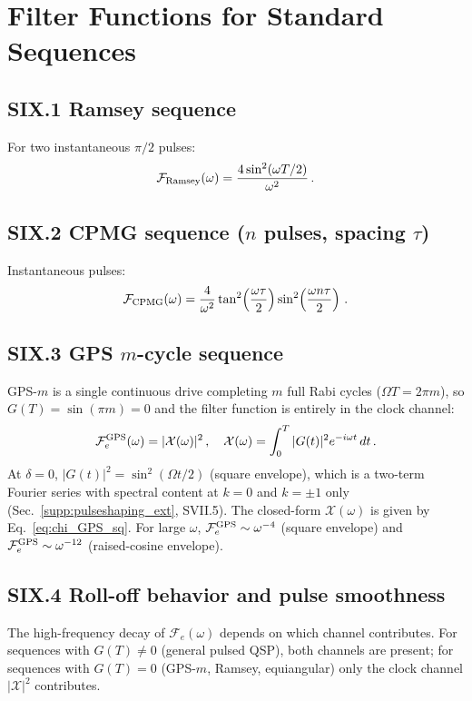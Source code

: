 \documentclass[aps,pra,twocolumn,superscriptaddress,longbibliography]{revtex4-2}
\newcommand{\be}{\begin{equation}}
\newcommand{\ee}{\end{equation}}
\begin{document}
\section{Filter Functions for Standard Sequences}
\label{supp:filter_functions}

\subsection*{SIX.1 Ramsey sequence}

For two instantaneous $\pi/2$ pulses:
\be
  \mathcal{F}_{\rm Ramsey}(\omega) = \frac{4\sin^2(\omega T/2)}{\omega^2}\,.
\ee

\subsection*{SIX.2 CPMG sequence ($n$ pulses, spacing $\tau$)}

Instantaneous pulses:
\be
  \mathcal{F}_{\rm CPMG}(\omega) = \frac{4}{\omega^2}
    \tan^2\!\left(\frac{\omega\tau}{2}\right)\sin^2\!\left(\frac{\omega n\tau}{2}\right)\,.
\ee

\subsection*{SIX.3 GPS $m$-cycle sequence}

GPS-$m$ is a single continuous drive completing $m$ full Rabi cycles ($\Omega T = 2\pi m$),
so $G(T)=\sin(\pi m)=0$ and the filter function is entirely in the clock channel:
\be
  \mathcal{F}_e^{\rm GPS}(\omega) = |\mathcal{X}(\omega)|^2\,,\quad
  \mathcal{X}(\omega) = \int_0^T|G(t)|^2 e^{-i\omega t}\,dt\,.
\ee
At $\delta=0$, $|G(t)|^2=\sin^2(\Omega t/2)$ (square envelope), which is a two-term
Fourier series with spectral content at $k=0$ and $k=\pm 1$ only
(Sec.~\ref{supp:pulseshaping_ext}, SVII.5).
The closed-form $\mathcal{X}(\omega)$ is given by Eq.~\eqref{eq:chi_GPS_sq}.
For large $\omega$, $\mathcal{F}_e^{\rm GPS}\sim\omega^{-4}$ (square envelope)
and $\mathcal{F}_e^{\rm GPS}\sim\omega^{-12}$ (raised-cosine envelope).

\subsection*{SIX.4 Roll-off behavior and pulse smoothness}

The high-frequency decay of $\mathcal{F}_e(\omega)$ depends on which channel
contributes.  For sequences with $G(T)\neq 0$ (general pulsed QSP), both channels
are present; for sequences with $G(T)=0$ (GPS-$m$, Ramsey, equiangular) only the
clock channel $|\mathcal{X}|^2$ contributes.
\end{document}
